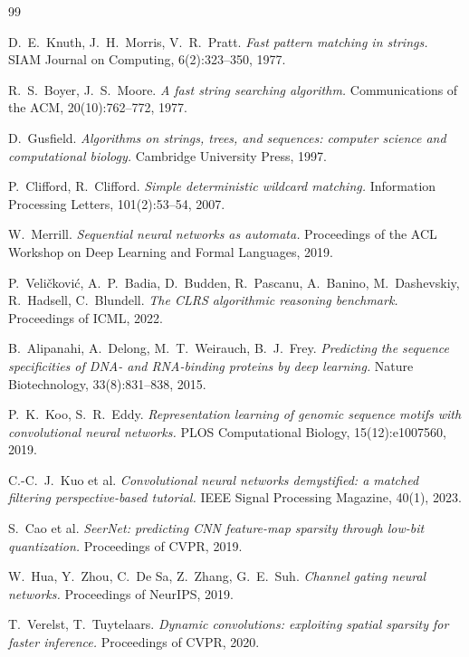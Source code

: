 \documentclass[11pt,a4paper]{article}
\begin{document}
\begin{thebibliography}{99}

D.~E.~Knuth, J.~H.~Morris, V.~R.~Pratt.
\emph{Fast pattern matching in strings.}
SIAM Journal on Computing, 6(2):323--350, 1977.

R.~S.~Boyer, J.~S.~Moore.
\emph{A fast string searching algorithm.}
Communications of the ACM, 20(10):762--772, 1977.

D.~Gusfield.
\emph{Algorithms on strings, trees, and sequences:
computer science and computational biology.}
Cambridge University Press, 1997.

P.~Clifford, R.~Clifford.
\emph{Simple deterministic wildcard matching.}
Information Processing Letters, 101(2):53--54, 2007.

W.~Merrill.
\emph{Sequential neural networks as automata.}
Proceedings of the ACL Workshop on Deep Learning and Formal Languages,
2019.

P.~Veli\v{c}kovi\'c, A.~P.~Badia, D.~Budden, R.~Pascanu, A.~Banino,
M.~Dashevskiy, R.~Hadsell, C.~Blundell.
\emph{The CLRS algorithmic reasoning benchmark.}
Proceedings of ICML, 2022.

B.~Alipanahi, A.~Delong, M.~T.~Weirauch, B.~J.~Frey.
\emph{Predicting the sequence specificities of DNA- and RNA-binding
proteins by deep learning.}
Nature Biotechnology, 33(8):831--838, 2015.

P.~K.~Koo, S.~R.~Eddy.
\emph{Representation learning of genomic sequence motifs with
convolutional neural networks.}
PLOS Computational Biology, 15(12):e1007560, 2019.

C.-C.~J.~Kuo et al.
\emph{Convolutional neural networks demystified: a matched filtering
perspective-based tutorial.}
IEEE Signal Processing Magazine, 40(1), 2023.

S.~Cao et al.
\emph{SeerNet: predicting CNN feature-map sparsity through low-bit
quantization.}
Proceedings of CVPR, 2019.

W.~Hua, Y.~Zhou, C.~De Sa, Z.~Zhang, G.~E.~Suh.
\emph{Channel gating neural networks.}
Proceedings of NeurIPS, 2019.

T.~Verelst, T.~Tuytelaars.
\emph{Dynamic convolutions: exploiting spatial sparsity for faster
inference.}
Proceedings of CVPR, 2020.

\end{thebibliography}
\end{document}
